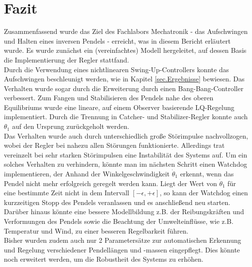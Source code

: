 \section{Fazit}
Zusammenfassend wurde das Ziel des Fachlabors Mechatronik - das Aufschwingen und Halten eines inversen Pendels - erreicht, was in diesem Bericht erläutert wurde. Es wurde zunächst ein (vereinfachtes) Modell hergeleitet, auf dessen Basis die Implementierung der Regler stattfand.\\

Durch die Verwendung eines nichtlinearen Swing-Up-Controllers konnte das Aufschwingen beschleunigt werden, wie in Kapitel \ref{sec.Ergebnisse} bewiesen. Das Verhalten wurde sogar durch die Erweiterung durch einen Bang-Bang-Controller verbessert. Zum Fangen und Stabilisieren des Pendels nahe des oberen Equilibriums wurde eine lineare, auf einem Observer basierende LQ-Regelung implementiert. Durch die Trennung in Catcher- und Stabilizer-Regler konnte auch $\theta_1$ auf den Ursprung zurückgeholt werden.\\
Das Verhalten wurde auch durch unterschiedlich große Störimpulse nachvollzogen, wobei der Regler bei nahezu allen Störungen funktionierte. Allerdings trat vereinzelt bei sehr starken Störimpulsen eine Instabilität des Systems auf. Um ein solches Verhalten zu verhindern, könnte man im nächsten Schritt einen Watchdog implementieren, der Anhand der Winkelgeschwindigkeit $\dot{\theta}_1$ erkennt, wenn das Pendel nicht mehr erfolgreich geregelt werden kann. Liegt der Wert von $\dot{\theta}_1$ für eine bestimmte Zeit nicht in dem Intervall $[-\epsilon,+\epsilon]$, so kann der Watchdog einen kurzzeitigen Stopp des Pendels veranlassen und es anschließend neu starten.\\

Darüber hinaus könnte eine bessere Modellbildung z.B. der Reibungskräften und Verformungen des Pendels sowie die Beachtung der Umwelteinflüsse, wie z.B. Temperatur und Wind, zu einer besseren Regelbarkeit führen. \\

Bisher wurden zudem auch nur 2 Parametersätze zur automatischen Erkennung und Regelung verschiedener Pendellängen und -massen eingepflegt. Dies könnte noch erweitert werden, um die Robustheit des Systems zu erhöhen. 
